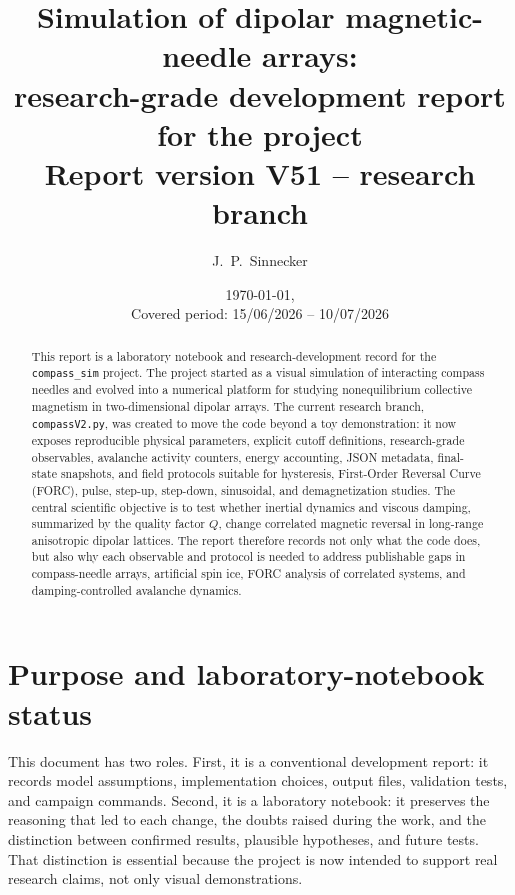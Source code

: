 \documentclass[11pt,a4paper]{article}
\title{\textbf{Simulation of dipolar magnetic-needle arrays:\\
research-grade development report for the \code{compass\_sim} project}\\[1ex]
\large Report version V51 -- \code{compassV2.py} research branch}
\author{J.~P.~Sinnecker}
\date{\today, \hhmm\\[0.5ex]
\small Covered period: 15/06/2026 -- 10/07/2026}
\newcommand{\code}[1]{\texttt{#1}}
\begin{document}
\maketitle

\begin{abstract}
\noindent
This report is a laboratory notebook and research-development record for the \code{compass\_sim} project. The project started as a visual simulation of interacting compass needles and evolved into a numerical platform for studying nonequilibrium collective magnetism in two-dimensional dipolar arrays. The current research branch, \code{compassV2.py}, was created to move the code beyond a toy demonstration: it now exposes reproducible physical parameters, explicit cutoff definitions, research-grade observables, avalanche activity counters, energy accounting, JSON metadata, final-state snapshots, and field protocols suitable for hysteresis, First-Order Reversal Curve (FORC), pulse, step-up, step-down, sinusoidal, and demagnetization studies. The central scientific objective is to test whether inertial dynamics and viscous damping, summarized by the quality factor $Q$, change correlated magnetic reversal in long-range anisotropic dipolar lattices. The report therefore records not only what the code does, but also why each observable and protocol is needed to address publishable gaps in compass-needle arrays, artificial spin ice, FORC analysis of correlated systems, and damping-controlled avalanche dynamics.
\end{abstract}

\tableofcontents
\newpage

\section{Purpose and laboratory-notebook status}

This document has two roles. First, it is a conventional development report: it records model assumptions, implementation choices, output files, validation tests, and campaign commands. Second, it is a laboratory notebook: it preserves the reasoning that led to each change, the doubts raised during the work, and the distinction between confirmed results, plausible hypotheses, and future tests. That distinction is essential because the project is now intended to support real research claims, not only visual demonstrations.
\end{document}
